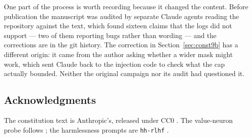 \documentclass[11pt]{article}
\newcommand{\code}[1]{\texttt{#1}}
\begin{document}
One part of the process is worth recording because it changed the content. Before
publication the manuscript was audited by separate Claude agents reading the
repository against the text, which found sixteen claims that the logs did not
support --- two of them reporting bugs rather than wording --- and the corrections
are in the git history. The correction in Section~\ref{sec:const9b} has a different
origin: it came from the author asking whether a wider mask might work, which sent
Claude back to the injection code to check what the cap actually bounded. Neither
the original campaign nor its audit had questioned it.

\subsection*{Acknowledgments}

The constitution text is Anthropic's, released under CC0
\citep{anthropic2026constitution}. The value-neuron probe follows
\citet{xu2026valueneurons}; the harmlessness prompts are \code{hh-rlhf}
\citep{bai2022hh}.



\end{document}
